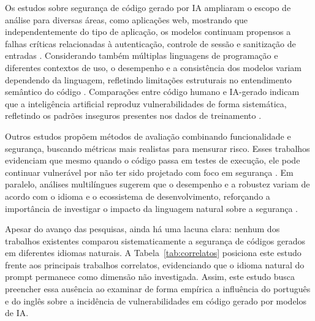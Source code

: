 \documentclass[12pt]{article}
\begin{document}
Os estudos sobre segurança de código gerado por IA ampliaram o escopo de análise para diversas áreas, como aplicações web, mostrando que independentemente do tipo de aplicação, os modelos continuam propensos a falhas críticas relacionadas à autenticação, controle de sessão e sanitização de entradas \cite{dora2025hiddenrisksllmgeneratedweb}. Considerando também múltiplas linguagens de programação e diferentes contextos de uso, o desempenho e a consistência dos modelos variam dependendo da linguagem, refletindo limitações estruturais no entendimento semântico do código \cite{xu2025cruxevalxbenchmarkmultilingualcode}. Comparações entre código humano e IA-gerado indicam que a inteligência artificial reproduz vulnerabilidades de forma sistemática, refletindo os padrões inseguros presentes nos dados de treinamento \cite{cotroneo2025humanwrittenvsaigeneratedcode}.

Outros estudos propõem métodos de avaliação combinando funcionalidade e segurança, buscando métricas mais realistas para mensurar risco. Esses trabalhos evidenciam que mesmo quando o código passa em testes de execução, ele pode continuar vulnerável por não ter sido projetado com foco em segurança \cite{peng2025cwevaloutcomedrivenevaluationfunctionality, belozerov2025securecodingaicreation}. Em paralelo, análises multilíngues sugerem que o desempenho e a robustez variam de acordo com o idioma e o ecossistema de desenvolvimento, reforçando a importância de investigar o impacto da linguagem natural sobre a segurança \cite{kharma2025securityqualityllmgeneratedcode}.

Apesar do avanço das pesquisas, ainda há uma lacuna clara: nenhum dos trabalhos existentes comparou sistematicamente a segurança de códigos gerados em diferentes idiomas naturais. A Tabela~\ref{tab:correlatos} posiciona este estudo frente aos principais trabalhos correlatos, evidenciando que o idioma natural do prompt permanece como dimensão não investigada. Assim, este estudo busca preencher essa ausência ao examinar de forma empírica a influência do português e do inglês sobre a incidência de vulnerabilidades em código gerado por modelos de IA.
\end{document}
